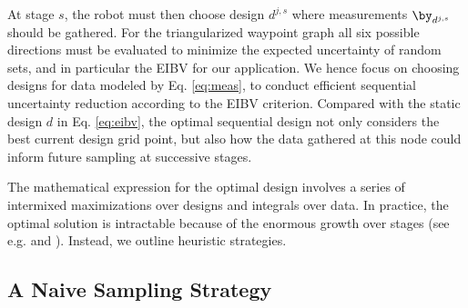At stage $s$, the robot must then choose design $d^{j,s}$ where measurements $\by_{d^{j,s}}$ should
be gathered. For the triangularized waypoint
graph all six possible
directions must be evaluated to minimize the expected uncertainty of random sets, and in particular the EIBV for our 
application. We hence focus on choosing designs for data modeled by
Eq. \eqref{eq:meas}, to conduct efficient sequential uncertainty
reduction according to the EIBV criterion. Compared with the
static design $d$ in Eq. \eqref{eq:eibv}, the optimal sequential
design not only considers the best current design grid point, but also
how the data gathered at this node could inform future sampling at
successive stages.

The mathematical expression for the optimal design involves a series
of intermixed maximizations over designs and integrals over data. In
practice, the optimal solution is intractable because of the enormous
growth over stages (see e.g. \cite{sucar2015probabilistic} and
\cite{powell2016perspectives}).  Instead, we outline heuristic
strategies.


 
\subsection{A Naive Sampling Strategy}
\label{naive}

